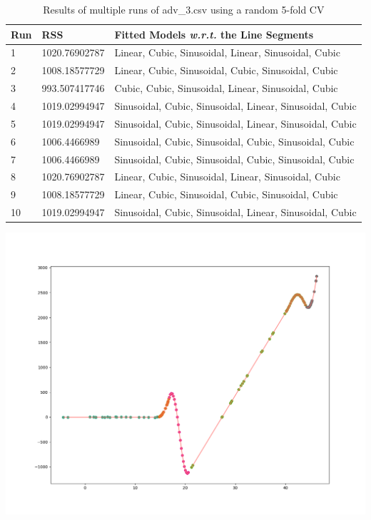 \documentclass[a4paper,11pt]{article}
\begin{document}
\begin{table}[ht!]
    \begin{minipage}{0.5\linewidth}
    \scriptsize
    \centering
    \caption{Results of multiple runs of adv\_3.csv using a random 5-fold CV}
    \label{tab:result1}
    \begin{tabular}{l l l}
        \toprule
        Run & RSS & Fitted Models \textit{w.r.t.} the Line Segments \\
        \midrule
        1
            & \num{1020.76902787}
            & Linear, Cubic, Sinusoidal, Linear, Sinusoidal, Cubic
        \\
        2
            & \num{1008.18577729}
            & Linear, Cubic, Sinusoidal, Cubic, Sinusoidal, Cubic
        \\
        3
            & \num{993.507417746}
            & Cubic, Cubic, Sinusoidal, Linear, Sinusoidal, Cubic
        \\
        4
            & \num{1019.02994947}
            & Sinusoidal, Cubic, Sinusoidal, Linear, Sinusoidal, Cubic
        \\
        5
            & \num{1019.02994947}
            & Sinusoidal, Cubic, Sinusoidal, Linear, Sinusoidal, Cubic
        \\
        6
            & \num{1006.4466989}
            & Sinusoidal, Cubic, Sinusoidal, Cubic, Sinusoidal, Cubic
        \\
        7
            & \num{1006.4466989}
            & Sinusoidal, Cubic, Sinusoidal, Cubic, Sinusoidal, Cubic
        \\
        8
            & \num{1020.76902787}
            & Linear, Cubic, Sinusoidal, Linear, Sinusoidal, Cubic
        \\
        9
            & \num{1008.18577729}
            & Linear, Cubic, Sinusoidal, Cubic, Sinusoidal, Cubic
        \\
        10
            & \num{1019.02994947}
            & Sinusoidal, Cubic, Sinusoidal, Linear, Sinusoidal, Cubic
        \\
        \bottomrule
    \end{tabular}
    \end{minipage}
    \begin{minipage}{0.5\linewidth}
    \centering
    \includegraphics[width=1\linewidth]{res/adv_3.png}

\end{minipage}
\end{table}
\end{document}
